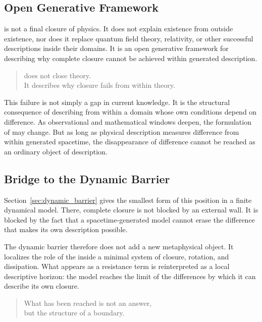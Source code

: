 \subsection*{Open Generative Framework}

\VED{} is not a final closure of physics.
It does not explain existence from outside existence,
nor does it replace quantum field theory,
relativity,
or other successful descriptions inside their domains.
It is an open generative framework for describing why complete closure
cannot be achieved within generated description.

\medskip
\begin{quote}
\VED{} does not close theory.\\
It describes why closure fails from within theory.
\end{quote}
\medskip

This failure is not simply a gap in current knowledge.
It is the structural consequence of describing from within a domain
whose own conditions depend on difference.
As observational and mathematical windows deepen,
the formulation of \VED{} may change.
But as long as physical description measures difference from within
generated spacetime,
the disappearance of difference cannot be reached as an ordinary
object of description.

\subsection*{Bridge to the Dynamic Barrier}

Section~\ref{sec:dynamic_barrier} gives the smallest form of this
position in a finite dynamical model.
There,
complete closure is not blocked by an external wall.
It is blocked by the fact that a spacetime-generated model cannot
erase the difference that makes its own description possible.

The dynamic barrier therefore does not add a new metaphysical object.
It localizes the role of the \DH{} inside a minimal system of closure,
rotation,
and dissipation.
What appears as a resistance term is reinterpreted as a local
descriptive horizon:
the model reaches the limit of the differences by which it can
describe its own closure.

\medskip
\begin{quote}
What has been reached is not an answer,\\
but the structure of a boundary.
\end{quote}
